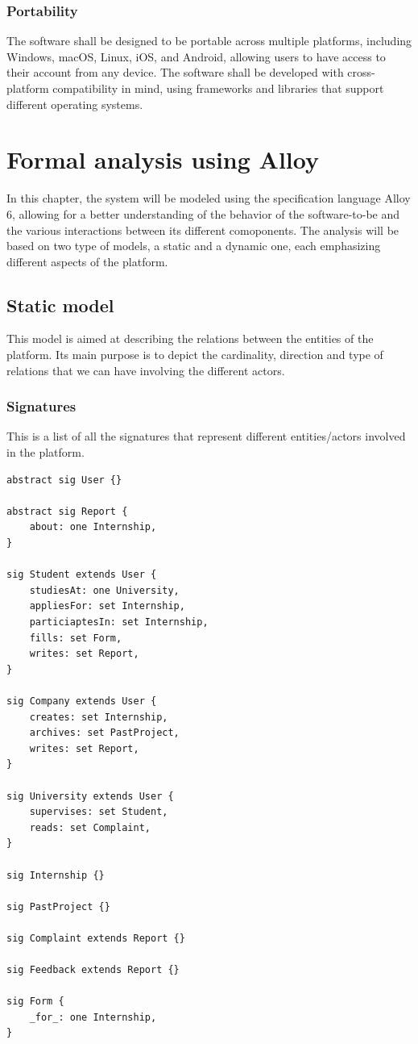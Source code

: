 \documentclass[11pt,twoside]{article}
\begin{document}
		\subsubsection{Portability}
		
The software shall be designed to be portable across multiple platforms, including Windows, macOS, Linux, iOS, and Android, allowing users to have access to their account from any device. The software shall be developed with cross-platform compatibility in mind, using frameworks and libraries that support different operating systems.	

\newpage
		
\section{Formal analysis using Alloy}
In this chapter, the system will be modeled using the specification language Alloy 6, allowing for a better understanding of the behavior of the software-to-be and the various interactions between its different comoponents. The analysis will be based on two type of models, a static and a dynamic one, each emphasizing different aspects of the platform.
	\subsection{Static model}
This model is aimed at describing the relations between the entities of the platform. Its main purpose is to depict the cardinality, direction and type of relations that we can have involving the different actors.
		\subsubsection{Signatures}
This is a list of all the signatures that represent different entities/actors involved in the platform.
{\small
\begin{verbatim}
abstract sig User {}

abstract sig Report {
    about: one Internship,
}

sig Student extends User {
	studiesAt: one University,
    appliesFor: set Internship,
    particiaptesIn: set Internship,
    fills: set Form,
    writes: set Report,
}

sig Company extends User {
    creates: set Internship,
    archives: set PastProject,
    writes: set Report,
}

sig University extends User {
    supervises: set Student,
    reads: set Complaint,
}

sig Internship {}

sig PastProject {}

sig Complaint extends Report {}

sig Feedback extends Report {}

sig Form {
    _for_: one Internship,
}
\end{verbatim}}
\end{document}

